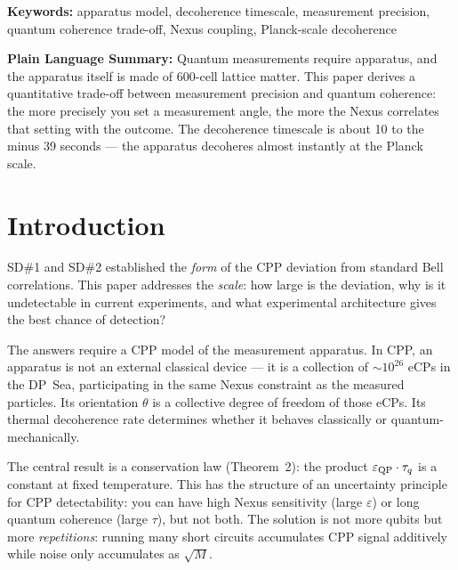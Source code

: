 \documentclass[11pt,letterpaper]{article}
\newcommand{\eps}{\varepsilon}
\begin{document}
\medskip\noindent
\textbf{Keywords:} apparatus model, decoherence timescale, measurement precision, quantum coherence trade-off, Nexus coupling, Planck-scale decoherence

\bigskip\noindent
\textbf{Plain Language Summary:}
Quantum measurements require apparatus, and the apparatus itself is made of 600-cell lattice matter. This paper derives a quantitative trade-off between measurement precision and quantum coherence: the more precisely you set a measurement angle, the more the Nexus correlates that setting with the outcome. The decoherence timescale is about 10 to the minus 39 seconds --- the apparatus decoheres almost instantly at the Planck scale.

\bigskip
\raggedright


\tableofcontents
\newpage

\section{Introduction}

SD\#1 and SD\#2 established the \emph{form} of the CPP deviation
from standard Bell correlations.  This paper addresses the
\emph{scale}: how large is the deviation, why is it undetectable in
current experiments, and what experimental architecture gives the
best chance of detection?

The answers require a CPP model of the measurement apparatus.  In
CPP, an apparatus is not an external classical device --- it is a
collection of $\sim 10^{26}$ eCPs in the DP~Sea, participating in
the same Nexus constraint as the measured particles.  Its orientation
$\theta$ is a collective degree of freedom of those eCPs.  Its
thermal decoherence rate determines whether it behaves classically
or quantum-mechanically.

The central result is a conservation law (Theorem~2): the product
$\eps_{\rm QP} \cdot \tau_q$ is a constant at fixed temperature.
This has the structure of an uncertainty principle for CPP
detectability: you can have high Nexus sensitivity (large $\eps$)
or long quantum coherence (large $\tau$), but not both.  The
solution is not more qubits but more \emph{repetitions}: running
many short circuits accumulates CPP signal additively while noise
only accumulates as $\sqrt{M}$.

\end{document}

